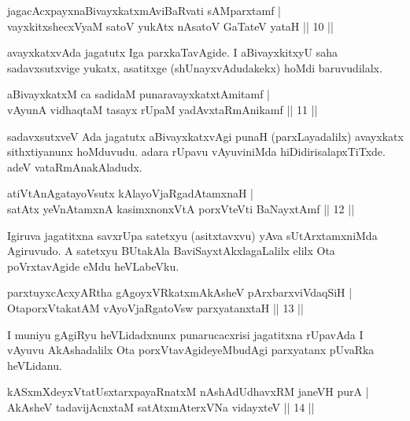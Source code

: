\begin{shl}
jagacAcxpayxnaBivayxkatxmAviBaRvati sAMparxtamf |\\
vayxkitxshecxVyaM satoV yukAtx nAsatoV GaTateV yataH \hfill || 10 ||
\end{shl}

\begin{artha}%
avayxkatxvAda jagatutx Iga parxkaTavAgide. I aBivayxkitxyU saha sadavxsutxvige yukatx, asatitxge (shUnayxvAdudakekx) hoMdi baruvudilalx.
\end{artha}

\begin{shl}
aBivayxkatxM ca sadidaM punaravayxkatxtAmitamf |\\
vAyunA vidhaqtaM tasayx rUpaM yadAvxtaRmAnikamf \hfill || 11 ||
\end{shl}

\begin{artha}
sadavxsutxveV Ada jagatutx aBivayxkatxvAgi punaH (parxLayadalilx) avayxkatx sithxtiyanunx hoMduvudu. adara rUpavu vAyuviniMda hiDidirisalapxTiTxde. adeV vataRmAnakAladudx. 
\end{artha}


\begin{shl}
atiVtAnAgatayoVsutx kAlayoVjaRgadAtamxnaH |\\
satAtx yeVnA\s \s tamxnA kasimxnonxVtA porxVteVti BaNayxtAmf \hfill || 12 ||
\end{shl}

\begin{artha}
Igiruva jagatitxna savxrUpa satetxyu (asitxtavxvu) yAva sUtArxtamxniMda Agiruvudo. A satetxyu BUtakAla BaviSayxtAkxlagaLalilx elilx Ota poVrxtavAgide eMdu heVLabeVku.
\end{artha}

\begin{shl}
parxtuyxcAcxyARtha gAgoyxVRkatxmAkAsheV pArxbarxviVdaqSiH |\\
OtaporxVtakatAM vAyoVjaRgatoV\s sw parxyatanxtaH \hfill || 13 ||
\end{shl}

\begin{artha}
I muniyu gAgiRyu heVLidadxnunx punarucacxrisi jagatitxna rUpavAda I vAyuvu AkAshadalilx Ota porxVtavAgideyeMbudAgi parxyatanx pUvaRka heVLidanu.
\end{artha}%

\begin{shl}
kASxmXdeyxVtatUsxtarxpayaRnatxM nAshAdUdhavxRM janeVH purA |\\
AkAsheV tadavijAcnxtaM satAtxmAterxVNa vidayxteV \hfill || 14 ||
\end{shl}

